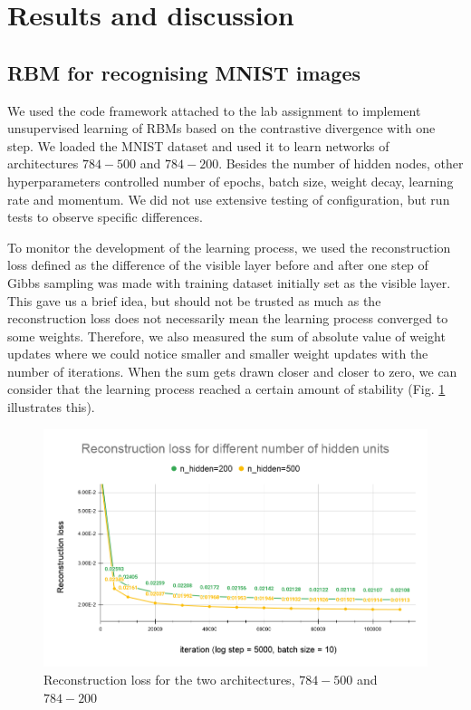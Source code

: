 \documentclass[a4paper]{article}
\begin{document}
\section{Results and discussion}

\subsection{RBM for recognising MNIST images}
We used the code framework attached to the lab assignment to implement unsupervised learning of RBMs based on the contrastive divergence with one step. We loaded the MNIST dataset and used it to learn networks of architectures $784-500$ and $784-200$. Besides the number of hidden nodes, other hyperparameters controlled number of epochs, batch size, weight decay, learning rate and momentum. We did not use extensive testing of configuration, but run tests to observe specific differences.

To monitor the development of the learning process, we used the reconstruction loss defined as the difference of the visible layer before and after one step of Gibbs sampling was made with training dataset initially set as the visible layer. This gave us a brief idea, but should not be trusted as much as the reconstruction loss does not necessarily mean the learning process converged to some weights. Therefore, we also measured the sum of absolute value of weight updates where we could notice smaller and smaller weight updates with the number of iterations. When the sum gets drawn closer and closer to zero, we can consider that the learning process reached a certain amount of stability (Fig. \ref{fig:rbm_recon_loss} illustrates this).

\begin{figure}[H]
    \centering
    \includegraphics[width=1.\linewidth]{img/4.1 Reconstruction loss for different number of hidden units.png}
    \caption{Reconstruction loss for the two architectures, $784-500$ and $784-200$}
    \label{fig:rbm_recon_loss}
\end{figure}
\end{document}
